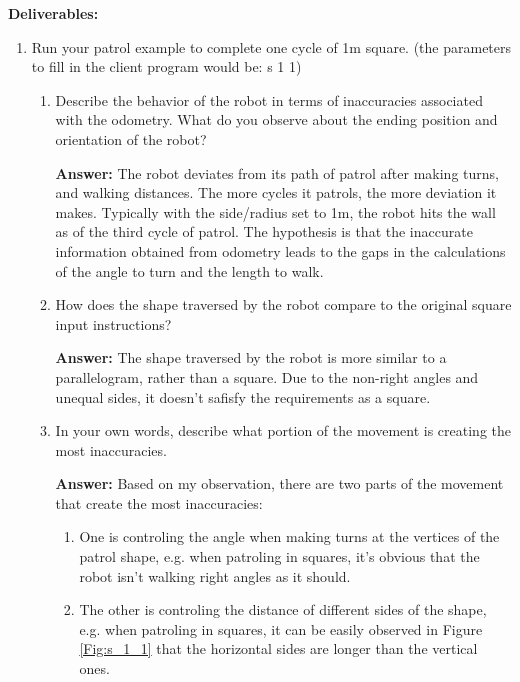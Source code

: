 \documentclass[12pt]{article}
\begin{document}
\textbf{Deliverables:}

\begin{enumerate}

    \item Run your patrol example to complete one cycle of 1m square. (the parameters to fill in the client program would be: s 1 1)
    
    \begin{enumerate}

        \item Describe the behavior of the robot in terms of inaccuracies associated with the odometry. What do you observe about the ending position and orientation of the robot?
        
        \textbf{Answer: }The robot deviates from its path of patrol after making turns, and walking distances. The more cycles it patrols, the more deviation it makes. Typically with the side/radius set to 1m, the robot hits the wall as of the third cycle of patrol. The hypothesis is that the inaccurate information obtained from odometry leads to the gaps in the calculations of the angle to turn and the length to walk.

        \item How does the shape traversed by the robot compare to the original square input instructions?
        
        \textbf{Answer: }The shape traversed by the robot is more similar to a parallelogram, rather than a square. Due to the non-right angles and unequal sides, it doesn't safisfy the requirements as a square.

        \item In your own words, describe what portion of the movement is creating the most inaccuracies.
        
        \textbf{Answer: }Based on my observation, there are two parts of the movement that create the most inaccuracies:
        \begin{enumerate}
          \item One is controling the angle when making turns at the vertices of the patrol shape, e.g. when patroling in squares, it's obvious that the robot isn't walking right angles as it should.
          \item The other is controling the distance of different sides of the shape, e.g. when patroling in squares, it can be easily observed in Figure \ref{Fig:s_1_1} that the horizontal sides are longer than the vertical ones.
        \end{enumerate} 


\end{enumerate}
\end{enumerate}
\end{document}
